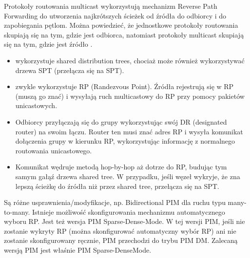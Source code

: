 \documentclass[../main.tex]{subfiles}
\begin{document}
    Protokoły routowania multicast wykorzystują mechanizm Reverse Path Forwarding do
    utworzenia najkrótszych ścieżek od źródła do odbiorcy i do zapobiegania pętlom. Można
    powiedzieć, że jednostkowe protokoły routowania skupiają się na tym, gdzie jest
    odbiorca, natomiast protokoły multicast skupiają
    się na tym, gdzie jest źródło .


    \begin{itemize}
        \item wykorzystuje shared distribution trees, chociaż może również wykorzystywać
        drzewa SPT (przełącza się na SPT).
        \item zwykle wykorzystuje RP (Randezvous Point). Źródła rejestrują się w RP (muszą go
        znać) i wysyłają ruch multicastowy do RP przy pomocy pakietów unicastowych.
        \item Odbiorcy
        przyłączają się do grupy wykorzystując swój DR (designated router) na swoim łączu. Router
        ten musi znać adres RP i wysyła komunikat dołączenia grupy w kierunku RP,
        wykorzystując informację z normalnego routowania unicastowego.
        \item Komunikat wędruje metodą hop-by-hop aż dotrze do RP, budując tym samym
        gałąź drzewa shared tree. W przypadku, jeśli węzeł wykryje, że zna lepszą ścieżkę do źródła
        niż przez shared tree, przełącza się na SPT.
    \end{itemize}

    Są różne usprawnienia/modyfikacje, np. Bidirectional PIM dla ruchu typu many-to-many.
    Istnieje możliwość skonfigurowania mechanizmu automatycznego wyboru RP.
    Jest też wersja PIM Sparse-Dense-Mode. W tej wersji PIM, jeśli nie zostanie wykryty RP
    (można skonfigurować automatyczny wybór RP) ani nie zostanie skonfigurowany ręcznie,
    PIM przechodzi do trybu PIM DM. Zalecaną wersją PIM jest właśnie PIM Sparse-DenseMode.
\end{document}
